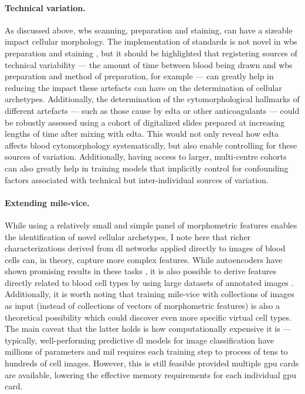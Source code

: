 \paragraph{Technical variation.} As discussed above, \ac{wbs} scanning, preparation and staining, can have a sizeable impact cellular morphology. The implementation of standards is not novel in \ac{wbs} preparation and staining \cite{Vives_Corrons2004-ha}, but it should be highlighted that registering sources of technical variability --- the amount of time between blood being drawn and \ac{wbs} preparation and method of preparation, for example --- can greatly help in reducing the impact these artefacts can have on the determination of cellular archetypes. Additionally, the determination of the cytomorphological hallmarks of different artefacts --- such as those cause by \ac{edta} or other anticoagulants --- could be robustly assessed using a cohort of digitalized slides prepared at increasing lengths of time after mixing with \ac{edta}. This would not only reveal how \ac{edta} affects blood cytomorphology systematically, but also enable controlling for these sources of variation. Additionally, having access to larger, multi-centre cohorts can also greatly help in training models that implicitly control for confounding factors associated with technical but inter-individual sources of variation.

\paragraph{Extending \ac{mile-vice}.} While using a relatively small and simple panel of morphometric features enables the identification of novel cellular archetypes, I note here that richer characterizations derived from \ac{dl} networks applied directly to images of blood cells can, in theory, capture more complex features. While autoencoders have shown promising results in these tasks \cite{Sommer2017-uj,Wei2021-gw}, it is also possible to derive features directly related to blood cell types by using large datasets of annotated images \cite{Matek2021-mp}. Additionally, it is worth noting that training \ac{mile-vice} with collections of images as input (instead of collections of vectors of morphometric features) is also a theoretical possibility which could discover even more specific virtual cell types. The main caveat that the latter holds is how computationally expensive it is --- typically, well-performing predictive \ac{dl} models for image classification have millions of parameters and \ac{mil} requires each training step to process of tens to hundreds of cell images. However, this is still feasible provided multiple \ac{gpu} cards are available, lowering the effective memory requirements for each individual \ac{gpu} card.

